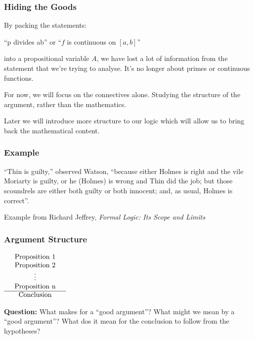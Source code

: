 \documentclass{beamer}
\theoremstyle{indentDefn} \newtheorem{defn}[]{Definition}
\begin{document}
\begin{frame}
	\frametitle{Hiding the Goods}

	By packing the statements: 
	
	\begin{center}
		``p divides ab'' or ``$f$ is continuous on $[a,b]$''
	\end{center}

	into a propositional variable $A$, we have lost a lot of information from the statement that we're trying to analyse. It's no longer about primes or continuous functions.

	\vspace{0.5cm}

	For now, we will focus on the connectives alone. Studying the structure of the argument, rather than the mathematics.

	\vspace{0.5cm}

	Later we will introduce more structure to our logic which will allow us to bring back the mathematical content. 

\end{frame}


	
\begin{frame}
  \frametitle{Example}
	
	``Thin is guilty,'' observed Watson, ``because either Holmes is right and the vile Moriarty is guilty, or he (Holmes) is wrong and Thin did the job; but those scoundrels are either both guilty or both innocent; and, as usual, Holmes is correct''.
	
	\vspace{5.5cm}


	\footnotesize{Example from Richard Jeffrey, \emph{Formal Logic: Its Scope and Limits}}

\end{frame}


\begin{frame}
	\frametitle{Argument Structure}
	\begin{center}
		$\begin{array}{ l c r }			
			& \textnormal{Proposition 1} & \\
			& \textnormal{Proposition 2} & \\
			& \vdots & \\
			& \textnormal{Proposition n} & \\
			\cline{1 - 3} 
			& \textnormal{Conclusion} & 	
		\end{array}$
	\end{center}

	\vspace{1cm}

{\bf Question:} What makes for a ``good argument''? What might we mean by a ``good argument''? What dos it mean for the conclusion to follow from the hypotheses? 
\end{frame}
\end{document}
